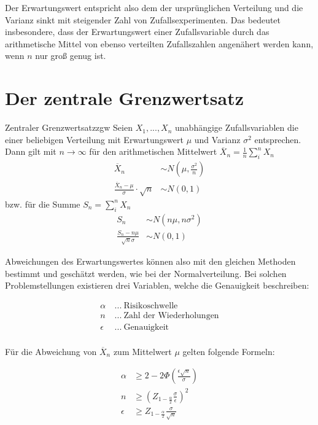 Der Erwartungswert entspricht also dem der ursprünglichen Verteilung und die Varianz sinkt mit steigender Zahl von Zufallsexperimenten.
Das bedeutet insbesondere, dass der Erwartungswert einer Zufallsvariable durch das arithmetische Mittel von ebenso verteilten Zufallszahlen angenähert werden kann, wenn $n$ nur groß genug ist.

\section{Der zentrale Grenzwertsatz}

\begin{theorem}{Zentraler Grenzwertsatz}{zgw}
Seien $X_1, ..., X_n$ unabhängige Zufallsvariablen die einer beliebigen
Verteilung mit Erwartungswert $\mu$ und Varianz $\sigma^2$ entsprechen. Dann
gilt mit $n\to\infty$ für den arithmetischen Mittelwert
$\overline{X}_n = \frac{1}{n}\sum_i^n X_n$
\begin{align*}
\overline{X}_n &\sim N(\mu, \frac{\sigma^2}{n}) \\
\frac{\overline{X}_n -\mu}{\sigma} \cdot \sqrt{n} &\sim N(0,1)
\end{align*}
bzw. für die Summe $S_n = \sum_i^n X_n$
\begin{align*}
S_n &\sim N(n\mu, n\sigma^2) \\
\frac{S_n -n\mu}{\sqrt{n}\sigma} &\sim N(0,1)
\end{align*}
\end{theorem}

Abweichungen des Erwartungswertes können also mit den gleichen Methoden bestimmt und geschätzt werden, wie bei der Normalverteilung.
Bei solchen Problemstellungen existieren drei Variablen, welche die Genauigkeit beschreiben:

\begin{align*}
  \alpha&\: ...\: \text{Risikoschwelle}\\
  n&\: ...\: \text{Zahl der Wiederholungen}\\
  \epsilon&\: ...\: \text{Genauigkeit}\\
\end{align*}

Für die Abweichung von $\overline{X}_n$ zum Mittelwert $\mu$ gelten folgende
Formeln:

\begin{align*}
  \alpha &\ge 2-2\Phi\left(\frac{\epsilon\sqrt{n}}{\sigma}\right)\\
  n &\ge \left(Z_{1-\frac{\alpha}{2}}\frac{\sigma}{\epsilon}\right)^2\\
  \epsilon &\ge Z_{1-\frac{\alpha}{2}}\frac{\sigma}{\sqrt{n}}\\
\end{align*}

